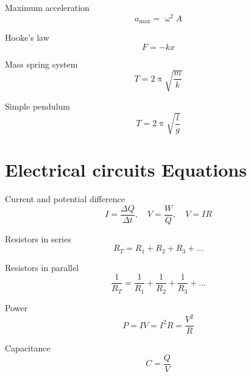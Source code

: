 Maximum acceleration
\begin{equation*}
a_{\text{max}}=\upomega^{2}A
\end{equation*}

Hooke's law
\begin{equation*}
F=-kx
\end{equation*}

Mass spring system
\begin{equation*}
T=2\uppi\sqrt{\frac{m}{k}}
\end{equation*}

Simple pendulum
\begin{equation*}
T=2\uppi\sqrt{\frac{l}{g}}
\end{equation*}

\section*{Electrical circuits Equations}
Current and potential difference
\begin{equation*}
I=\frac{\Delta Q}{\Delta t}, \quad V=\frac{W}{Q}, \quad V=IR
\end{equation*}

Resistors in series
\begin{equation*}
R_{T}=R_{1}+R_{2}+R_{3}+\dots
\end{equation*}

Resistors in parallel
\begin{equation*}
\frac{1}{R_{T}}=\frac{1}{R_{1}}+\frac{1}{R_{2}}+\frac{1}{R_{3}}+\dots
\end{equation*}

Power
\begin{equation*}
P=IV=I^{2}R=\frac{V^{2}}{R}
\end{equation*}

Capacitance 
\begin{equation*}
C=\frac{Q}{V}
\end{equation*}